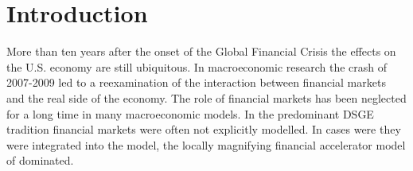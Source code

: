 \documentclass[12pt,letterpaper,fleqn]{article}           %
\begin{document}

\section{Introduction}\label{sec:Introduction}

More than ten years after the onset of the Global Financial Crisis %
the effects on the U.S. economy are still ubiquitous. %
In macroeconomic research the crash of 2007-2009 led to a reexamination of the interaction between financial markets and the real side of the economy. The role of financial markets has been neglected for a long time in many macroeconomic models. In the predominant DSGE tradition financial markets were often not explicitly modelled. In cases were they were integrated into the model, the locally magnifying financial accelerator model of \textcite{bernanke89, bgg99} dominated. %
\end{document}
